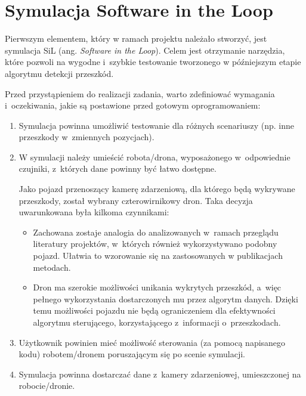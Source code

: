 \chapter{Symulacja Software in the Loop}
\label{cha:symulacja}


Pierwszym elementem, który w ramach projektu należało stworzyć, jest symulacja SiL (ang. \textit{Software in the Loop}). Celem jest otrzymanie narzędzia, które pozwoli na wygodne i~szybkie testowanie tworzonego w późniejszym etapie algorytmu detekcji przeszkód.

Przed przystąpieniem do realizacji zadania, warto zdefiniować wymagania i~oczekiwania, jakie są postawione przed gotowym oprogramowaniem:
\begin{enumerate}
    \item Symulacja powinna umożliwić testowanie dla różnych scenariuszy (np. inne przeszkody w~zmiennych pozycjach).
    \item W symulacji należy umieścić robota/drona, wyposażonego w~odpowiednie czujniki, z~których dane powinny być łatwo dostępne.
    
    Jako pojazd przenoszący kamerę zdarzeniową, dla którego będą wykrywane przeszkody, został wybrany czterowirnikowy dron. Taka decyzja uwarunkowana była kilkoma czynnikami:
    \begin{itemize}
        \item Zachowana zostaje analogia do analizowanych w~ramach przeglądu literatury projektów, w~których również wykorzystywano podobny pojazd. Ułatwia to wzorowanie się na zastosowanych w publikacjach metodach. 
        \item Dron ma szerokie możliwości unikania wykrytych przeszkód, a~więc pełnego wykorzystania dostarczonych mu przez algorytm danych. Dzięki temu możliwości pojazdu nie będą ograniczeniem dla efektywności algorytmu sterującego, korzystającego z~informacji o~przeszkodach.
    \end{itemize}
    \item Użytkownik powinien mieć możliwość sterowania (za pomocą napisanego kodu) robotem/dronem poruszającym się po scenie symulacji.
    \item Symulacja powinna dostarczać dane z~kamery zdarzeniowej, umieszczonej na robocie/dronie.
\end{enumerate}



